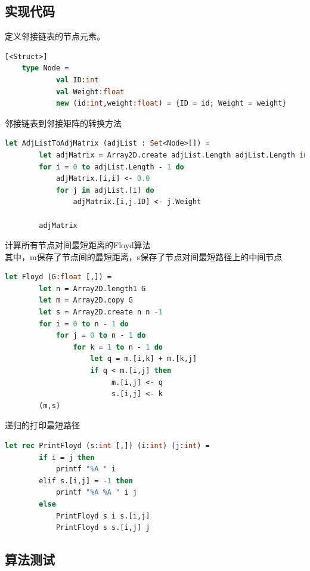 \documentclass[a4paper]{article}
\begin{document}
\subsection{实现代码}

定义邻接链表的节点元素。

\begin{lstlisting}[language=ML]
    [<Struct>]
    type Node = 
            val ID:int
            val Weight:float
            new (id:int,weight:float) = {ID = id; Weight = weight}
\end{lstlisting}

邻接链表到邻接矩阵的转换方法

\begin{lstlisting}[language=ML]
    let AdjListToAdjMatrix (adjList : Set<Node>[]) =
        let adjMatrix = Array2D.create adjList.Length adjList.Length infinity
        for i = 0 to adjList.Length - 1 do
            adjMatrix.[i,i] <- 0.0
            for j in adjList.[i] do
                adjMatrix.[i,j.ID] <- j.Weight
        
        adjMatrix
\end{lstlisting}

计算所有节点对间最短距离的Floyd算法\\
其中，m保存了节点间的最短距离，s保存了节点对间最短路径上的中间节点

\begin{lstlisting}[language=ML]
    let Floyd (G:float [,]) = 
        let n = Array2D.length1 G
        let m = Array2D.copy G
        let s = Array2D.create n n -1
        for i = 0 to n - 1 do
            for j = 0 to n - 1 do
                for k = 1 to n - 1 do
                    let q = m.[i,k] + m.[k,j]
                    if q < m.[i,j] then
                         m.[i,j] <- q
                         s.[i,j] <- k
        (m,s)
\end{lstlisting}

递归的打印最短路径

\begin{lstlisting}[language=ML]
    let rec PrintFloyd (s:int [,]) (i:int) (j:int) = 
        if i = j then
            printf "%A " i
        elif s.[i,j] = -1 then
            printf "%A %A " i j
        else
            PrintFloyd s i s.[i,j]
            PrintFloyd s s.[i,j] j
\end{lstlisting}

\subsection{算法测试}
\end{document}
